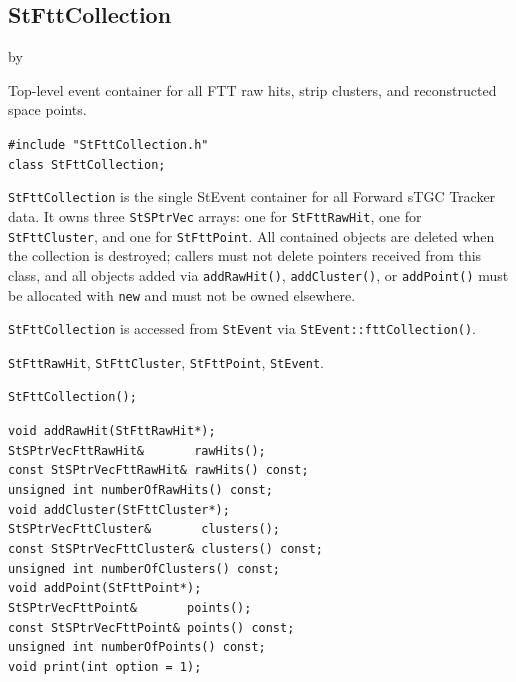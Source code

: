 \documentclass[twoside]{article}
\newcommand{\entrylabel}[1]{\mbox{\textbf{{#1}}}\hfil}%
\newenvironment{entry}
{\begin{list}{}%
    {\renewcommand{\makelabel}{\entrylabel}%
     \setlength{\labelwidth}{90pt}%
     \setlength{\leftmargin}{\labelwidth}
     \advance\leftmargin by \labelsep%
      }%
    }%
  {\end{list}}
\newcommand{\Entrylabel}[1]%
{\raisebox{0pt}[1ex][0pt]{\makebox[\labelwidth][l]%
    {\parbox[t]{\labelwidth}{\hspace{0pt}\textbf{{#1}}}}}}
\newenvironment{Entry}%
{\renewcommand{\entrylabel}{\Entrylabel}\begin{entry}}%
  {\end{entry}}
\begin{document}
\subsection{StFttCollection}
\label{sec:StFttCollection}
\begin{Entry}
\item[Summary] Top-level event container for all FTT raw hits, strip clusters, and
  reconstructed space points.
\item[Synopsis]
    \verb+#include "StFttCollection.h"+\\
    \verb+class StFttCollection;+\\
\item[Description]
  \texttt{StFttCollection} is the single StEvent container for all Forward sTGC Tracker
  data.  It owns three \texttt{StSPtrVec} arrays: one for \texttt{StFttRawHit}, one for
  \texttt{StFttCluster}, and one for \texttt{StFttPoint}.  All contained objects are
  deleted when the collection is destroyed; callers must not delete pointers received from
  this class, and all objects added via \texttt{addRawHit()}, \texttt{addCluster()}, or
  \texttt{addPoint()} must be allocated with \texttt{new} and must not be owned elsewhere.

  \texttt{StFttCollection} is accessed from \texttt{StEvent} via
  \texttt{StEvent::fttCollection()}.
\item[Related Classes]
  \texttt{StFttRawHit}, \texttt{StFttCluster}, \texttt{StFttPoint}, \texttt{StEvent}.
\item[Public\\ Constructors]
    \verb+StFttCollection();+\\
\item[Public Member\\ Functions]
    \verb+void addRawHit(StFttRawHit*);+\\
    \verb+StSPtrVecFttRawHit&       rawHits();+\\
    \verb+const StSPtrVecFttRawHit& rawHits() const;+\\
    \verb+unsigned int numberOfRawHits() const;+\\[2pt]
    \verb+void addCluster(StFttCluster*);+\\
    \verb+StSPtrVecFttCluster&       clusters();+\\
    \verb+const StSPtrVecFttCluster& clusters() const;+\\
    \verb+unsigned int numberOfClusters() const;+\\[2pt]
    \verb+void addPoint(StFttPoint*);+\\
    \verb+StSPtrVecFttPoint&       points();+\\
    \verb+const StSPtrVecFttPoint& points() const;+\\
    \verb+unsigned int numberOfPoints() const;+\\[2pt]
    \verb+void print(int option = 1);+\\
\end{Entry}
\clearpage
\end{document}
